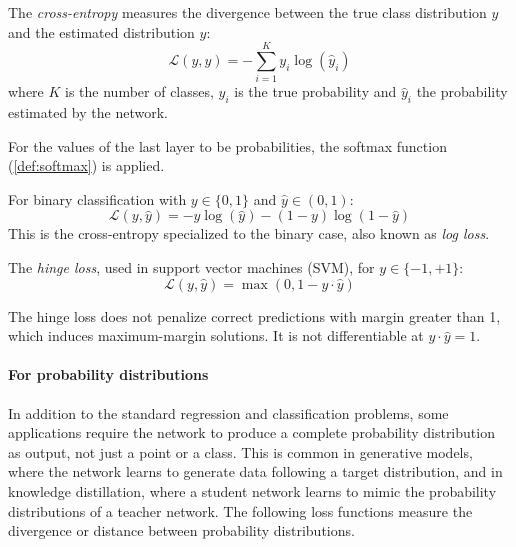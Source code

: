 \begin{definition}\label{def:cross_entropy}
	The \textit{cross-entropy} measures the divergence between the true class distribution \(y\) and the estimated distribution \(\hat{y}\):
	\begin{equation}
		\mathcal{L}(y, \hat{y}) = -\sum_{i=1}^{K} y_i \log(\hat{y}_i)
		\label{eq:cross_entropy}
	\end{equation}
	where $K$ is the number of classes, \(y_i\) is the true probability and \(\hat{y}_i\) the probability estimated by the network.
\end{definition}

For the values of the last layer to be probabilities, the softmax function (\autoref{def:softmax}) is applied.

\begin{definition}\label{def:binary_cross_entropy}
	For binary classification with \(y \in \{0, 1\}\) and \(\hat{y} \in (0, 1)\):
	\[
		\mathcal{L}(y, \hat{y}) = -y \log(\hat{y}) - (1-y) \log(1 - \hat{y})
	\]
	This is the cross-entropy specialized to the binary case, also known as \textit{log loss}.
\end{definition}

\begin{definition}\label{def:hinge_loss}
	The \textit{hinge loss}, used in support vector machines (SVM), for \(y \in \{-1, +1\}\):
	\[
		\mathcal{L}(y, \hat{y}) = \max(0, 1 - y \cdot \hat{y})
	\]
\end{definition}

The hinge loss does not penalize correct predictions with margin greater than 1, which induces maximum-margin solutions. It is not differentiable at \(y \cdot \hat{y} = 1\).

\paragraph{For probability distributions}

In addition to the standard regression and classification problems, some applications require the network to produce a complete probability distribution as output, not just a point or a class. This is common in generative models, where the network learns to generate data following a target distribution, and in knowledge distillation, where a student network learns to mimic the probability distributions of a teacher network. The following loss functions measure the divergence or distance between probability distributions.

